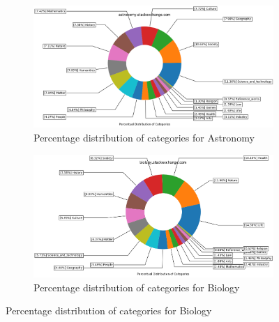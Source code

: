 \begin{figure}[H]
    \centering
	\begin{subfigure}{0.9\textwidth}
    	\centering
        	\includegraphics[width=1\linewidth]{imgs/percentual-distribution/astronomy_stackexchange_com_donut}
        	\caption{Percentage distribution of categories for Astronomy}
        	\label{fig:percentage-distribution-astronomy}
    \end{subfigure}%
    
\par\bigskip %
\par\bigskip %
	\begin{subfigure}{0.9\textwidth}
    \centering
        \includegraphics[width=1\linewidth]{imgs/percentual-distribution/biology_stackexchange_com_donut}
        \caption{Percentage distribution of categories for Biology}
        \label{fig:percentage-distribution-biology}
    \end{subfigure}
 
\par\bigskip %
\par\bigskip %


\end{figure}
